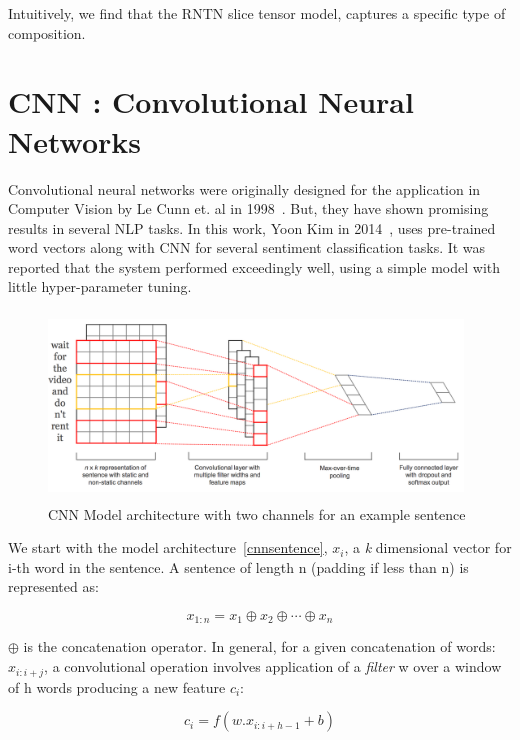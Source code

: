Intuitively, we find that the RNTN slice tensor model, captures a specific type of composition.

\section{CNN : Convolutional Neural Networks}
Convolutional neural networks were originally designed for the application in Computer Vision by  Le Cunn et. al in 1998~\parencite{lecunoriginal}. But, they have shown promising results in several NLP tasks. In this work, Yoon Kim in 2014~\parencite{cnnsentence}, uses pre-trained word vectors along with CNN for several sentiment classification tasks. It was reported that the system performed exceedingly well, using a simple model with little hyper-parameter tuning.

\begin{figure}[ht!]
	\centering
		\includegraphics[height=50mm,  width=110mm]{figures/5_cnnsentence.png}
		\caption[CNN Model Architecture]{CNN Model architecture with two channels for an example sentence}
			\label{cnnsentence}
\end{figure}


We start with the model architecture~\autoref{cnnsentence}, ${x}_{i}$, a \textit{k} dimensional vector for i-th word in the sentence. A sentence of length n (padding if less than n) is represented as:

\begin{equation}
{x}_{1:n} = {x}_{1}  \oplus {x}_{2} \oplus  \cdots \oplus {x}_{n}
\end{equation}

$\oplus$ is the concatenation operator. In general, for a given concatenation of words: ${x}_{i:i+j}$, a convolutional operation involves application of a \textit{filter} w over a window of h words producing a new feature ${c}_{i}$:

\begin{equation}
{c}_{i} = f(w. {x}_{i:i+h-1} + b)
\end{equation}

